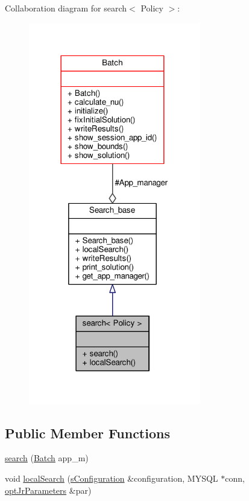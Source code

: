 Collaboration diagram for search$<$ Policy $>$\-:\nopagebreak
\begin{figure}[H]
\begin{center}
\leavevmode
\includegraphics[width=213pt]{classsearch__coll__graph}
\end{center}
\end{figure}
\subsection*{Public Member Functions}
\begin{DoxyCompactItemize}
\item 
\hyperlink{classsearch_a68606af5b4adbb5d9f7df88f8ed06e2c}{search} (\hyperlink{classBatch}{Batch} app\-\_\-m)
\item 
void \hyperlink{classsearch_a43081dcb0553c48414c0e358323fecb2}{local\-Search} (\hyperlink{readConfigurationFile_8hh_ab8f35b1da3261263c5e9c0e7c8921f5c}{s\-Configuration} \&configuration, M\-Y\-S\-Q\-L $\ast$conn, \hyperlink{classoptJrParameters}{opt\-Jr\-Parameters} \&par)
\end{DoxyCompactItemize}

